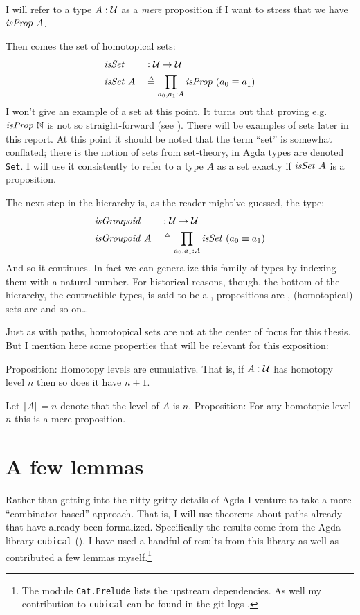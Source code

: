 I will refer to a type $A \mathrel{:} \mathcal{U}$ as a \emph{mere} proposition if I want to
stress that we have $\isProp\ A$.

Then comes the set of homotopical sets:
%
\begin{equation}
\begin{aligned}
& \isSet    && \tp \MCU \to \MCU \\
& \isSet\ A && \defeq \prod_{a_0, a_1 \tp A} \isProp\ (a_0 \equiv a_1)
\end{aligned}
\end{equation}
%
I won't give an example of a set at this point. It turns out that proving e.g.
$\isProp\ \bN$ is not so straight-forward (see \cite[\S3.1.4]{hott-2013}).
There will be examples of sets later in this report. At this point it should be
noted that the term ``set'' is somewhat conflated; there is the notion of sets
from set-theory, in Agda types are denoted \texttt{Set}. I will use it
consistently to refer to a type $A$ as a set exactly if $\isSet\ A$ is
a proposition.

The next step in the hierarchy is, as the reader might've guessed, the type:
%
\begin{equation}
\begin{aligned}
& \isGroupoid    && \tp \MCU \to \MCU \\
& \isGroupoid\ A && \defeq \prod_{a_0, a_1 \tp A} \isSet\ (a_0 \equiv a_1)
\end{aligned}
\end{equation}
%
And so it continues. In fact we can generalize this family of types by indexing
them with a natural number. For historical reasons, though, the bottom of the
hierarchy, the contractible types, is said to be a , propositions
are , (homotopical) sets are  and so on\ldots

Just as with paths, homotopical sets are not at the center of focus for this
thesis. But I mention here some properties that will be relevant for this
exposition:

Proposition: Homotopy levels are cumulative. That is, if $A \mathrel{:} \mathcal{U}$ has
homotopy level $n$ then so does it have $n + 1$.

Let $\left\Vert A \right\Vert = n$ denote that the level of $A$ is $n$.
Proposition: For any homotopic level $n$ this is a mere proposition.
%
\section{A few lemmas}
Rather than getting into the nitty-gritty details of Agda I venture to take a
more ``combinator-based'' approach. That is, I will use theorems about paths
already that have already been formalized. Specifically the results come from
the Agda library \texttt{cubical} (). I have used a handful of
results from this library as well as contributed a few lemmas myself.\footnote{The module \texttt{Cat.Prelude} lists the upstream dependencies. As well my contribution to \texttt{cubical} can be found in the git logs .}

